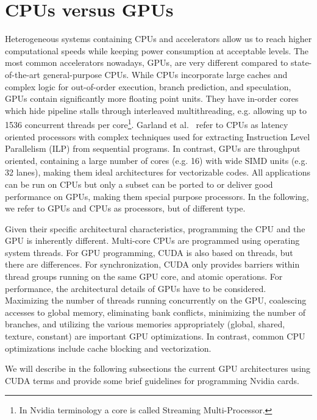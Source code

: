 \section{CPUs versus GPUs}
Heterogeneous systems containing CPUs and accelerators allow us to reach higher
computational speeds while keeping power consumption at acceptable levels. The
most common accelerators nowadays, GPUs, are very different compared to
state-of-the-art general-purpose CPUs. While CPUs incorporate large caches and
complex logic for out-of-order execution, branch prediction, and speculation,
GPUs contain significantly more floating point units. They have in-order cores
which hide pipeline stalls through interleaved multithreading, e.g. allowing up
to 1536 concurrent threads per core\footnote{In Nvidia terminology a core is
called Streaming Multi-Processor.}.
Garland et al.~\cite{garland2010} refer to CPUs as latency oriented processors
with complex techniques used for extracting Instruction Level Parallelism (ILP)
from sequential programs. In contrast, GPUs are throughput oriented, containing
a large number of cores (e.g. 16) with wide SIMD units (e.g. 32 lanes), making
them ideal architectures for vectorizable codes. All applications can be run on
CPUs but only a subset can be ported to or deliver good performance on GPUs,
making them special purpose processors. In the following, we refer to GPUs and
CPUs as processors, but of different type.

Given their specific architectural characteristics, programming the CPU and the
GPU is inherently different. Multi-core CPUs are programmed using operating
system threads. For GPU programming, CUDA is also based on threads, but there
are differences. For synchronization, CUDA only provides barriers within thread
groups running on the same GPU core, and atomic operations. For performance, the
architectural details of GPUs have to be considered. Maximizing the number of
threads running concurrently on the GPU, coalescing accesses to global memory,
eliminating bank conflicts, minimizing the number of branches, and utilizing the
various memories appropriately (global, shared, texture, constant) are important
GPU optimizations. In contrast, common CPU optimizations include cache blocking
and vectorization.

We will describe in the following subsections the current GPU architectures
using CUDA terms and provide some brief guidelines for programming Nvidia cards.

